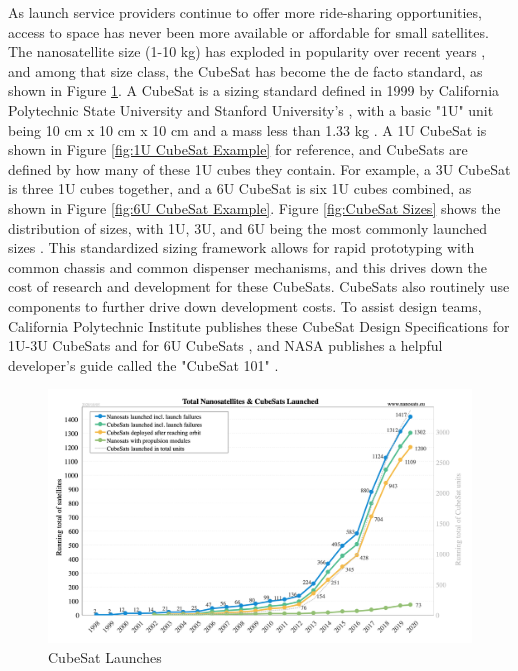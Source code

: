 As launch service providers continue to offer more ride-sharing opportunities, access to space has never been more available or affordable for small satellites. The nanosatellite size (1-10 kg) has exploded in popularity over recent years \citep{NanosatsEU}, and among that size class, the CubeSat has become the de facto standard, as shown in Figure \ref{fig:CubeSat Launches}. A CubeSat is a sizing standard defined in 1999 by California Polytechnic State University and Stanford University's , with a basic "1U" unit being 10 cm x 10 cm x 10 cm and a mass less than 1.33 kg \citep{DesignSpec}. A 1U CubeSat is shown in Figure \ref{fig:1U CubeSat Example} for reference, and CubeSats are defined by how many of these 1U cubes they contain. For example, a 3U CubeSat is three 1U cubes together, and a 6U CubeSat is six 1U cubes combined, as shown in Figure \ref{fig:6U CubeSat Example}. Figure \ref{fig:CubeSat Sizes} shows the distribution of sizes, with 1U, 3U, and 6U being the most commonly launched sizes \citep{NanosatsEU}. This standardized sizing framework allows for rapid prototyping with common chassis and common dispenser mechanisms, and this drives down the cost of research and development for these CubeSats. CubeSats also routinely use  components to further drive down development costs. To assist design teams, California Polytechnic Institute publishes these CubeSat Design Specifications for 1U-3U CubeSats and for 6U CubeSats \citep{DesignSpec}, and NASA publishes a helpful developer's guide called the "CubeSat 101" \citep{NASA101}.

\begin{figure}[H]
    \centering
    \includegraphics[width=\textwidth]{Thesis/Literature_Review/Lit Review Figures/total launched.png}
    \caption{CubeSat Launches}
    \label{fig:CubeSat Launches}
\end{figure}

